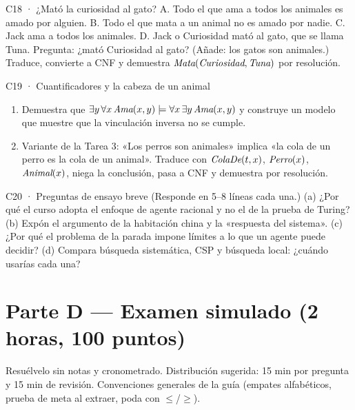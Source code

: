\begin{ejercicio}{C18 · ¿Mató la curiosidad al gato? }
A. Todo el que ama a todos los animales es amado por alguien. B. Todo el que mata a un animal no es
amado por nadie. C. Jack ama a todos los animales. D. Jack o Curiosidad mató al gato, que se llama Tuna.
Pregunta: ¿mató Curiosidad al gato? (Añade: los gatos son animales.)
Traduce, convierte a CNF y demuestra $\textit{Mata}(\textit{Curiosidad},\textit{Tuna})$ por resolución.
\end{ejercicio}

\begin{ejercicio}{C19 · Cuantificadores y la cabeza de un animal }
\begin{enumerate}[label=(\alph*)]
\item Demuestra que $\exists y\,\forall x\,\textit{Ama}(x,y)\models\forall x\,\exists y\,\textit{Ama}(x,y)$ y
construye un modelo que muestre que la vinculación inversa no se cumple.
\item Variante de la Tarea 3: «Los perros son animales» implica «la cola de un perro es la cola de un
animal». Traduce con $\textit{ColaDe}(t,x)$, $\textit{Perro}(x)$, $\textit{Animal}(x)$, niega la conclusión, pasa a CNF y
demuestra por resolución.
\end{enumerate}
\end{ejercicio}

\begin{ejercicio}{C20 · Preguntas de ensayo breve }
(Responde en 5–8 líneas cada una.)
(a) ¿Por qué el curso adopta el enfoque de agente racional y no el de la prueba de Turing?
(b) Expón el argumento de la habitación china y la «respuesta del sistema».
(c) ¿Por qué el problema de la parada impone límites a lo que un agente puede decidir?
(d) Compara búsqueda sistemática, CSP y búsqueda local: ¿cuándo usarías cada una?
\end{ejercicio}

\newpage
\section{Parte D — Examen simulado (2 horas, 100 puntos)}

\begin{nota}
Resuélvelo sin notas y cronometrado. Distribución sugerida: 15 min por pregunta y 15 min de revisión.
Convenciones generales de la guía (empates alfabéticos, prueba de meta al extraer, poda con $\le$/$\ge$).
\end{nota}

